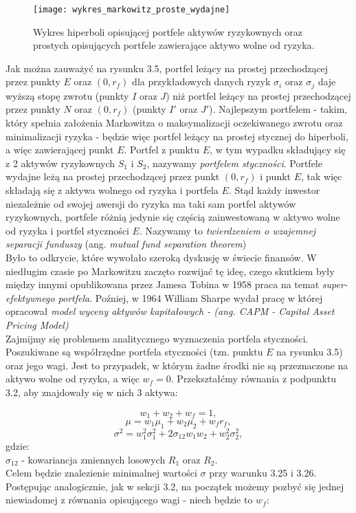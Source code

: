 \documentclass[magister]{dyplom}
\begin{document}
\begin{figure}[h]
	\centering
	\texttt{[image: wykres\_markowitz\_proste\_wydajne]}
	\caption{Wykres hiperboli opisującej portfele aktywów ryzykownych oraz prostych opisujących portfele zawierające aktywo wolne od ryzyka.}
\end{figure}

Jak można zauważyć na rysunku 3.5, portfel leżący na prostej przechodzącej przez punkty $E$ oraz $(0, r_f)$ dla przykładowych danych ryzyk $\sigma_i$ oraz $\sigma_j$ daje wyższą stopę zwrotu (punkty $I$ oraz $J$) niż portfel leżący na prostej przechodzącej przez punkty $N$ oraz $(0, r_f)$ (punkty $I'$ oraz $J'$). Najlepszym portfelem - takim, który spełnia założenia Markowitza o maksymalizacji oczekiwanego zwrotu oraz minimalizacji ryzyka - będzie więc portfel leżący na prostej stycznej do hiperboli, a więc zawierającej punkt $E$. Portfel z punktu $E$, w tym wypadku składujący się z 2 aktywów ryzykownych $S_1$ i $S_2$, nazywamy \textit{portfelem styczności}. Portfele wydajne leżą na prostej przechodzącej przez punkt $(0,r_f)$ i punkt $E$, tak więc składają się z aktywa wolnego od ryzyka i portfela $E$. Stąd każdy inwestor niezależnie od swojej awersji do ryzyka ma taki sam portfel aktywów ryzykownych, portfele różnią jedynie się częścią zainwestowaną w aktywo wolne od ryzyka i portfel styczności $E$. Nazywamy to \textit{twierdzeniem o wzajemnej separacji funduszy} (ang. \textit{mutual fund separation theorem})\\ 

Było to odkrycie, które wywołało szeroką dyskusję w świecie finansów. W niedługim czasie po Markowitzu zaczęto rozwijać tę ideę, czego skutkiem były między innymi opublikowana przez Jamesa Tobina w 1958 praca na temat \textit{super-efektywnego portfela}. Poźniej, w 1964 William Sharpe wydał pracę w której opracował \textit{model wyceny aktywów kapitałowych - (ang. CAPM - Capital Asset Pricing Model)}\cite{holton}\\

Zajmijmy się problemem analitycznego wyznaczenia portfela styczności. Poszukiwane są współrzędne portfela styczności (tzn. punktu $E$ na rysunku 3.5) oraz jego wagi. Jest to przypadek, w którym żadne środki nie są przeznaczone na aktywo wolne od ryzyka, a więc $w_f = 0$. Przekształćmy równania z podpunktu 3.2, aby znajdowały się w nich 3 aktywa: 

\begin{equation}
	w_1 + w_2 + w_f = 1,
\end{equation}
\begin{equation}
	\mu = w_1\mu_1 + w_2\mu_2 + w_fr_f,
\end{equation}
\begin{equation}
	\sigma^2 = w_1^2\sigma_1^2 + 2\sigma_{12}w_1w_2 + w_2^2\sigma_2^2,
\end{equation}
gdzie:\\
$\sigma_{12}$ - kowariancja zmiennych losowych $R_1$ oraz $R_2$.\\
Celem będzie znalezienie minimalnej wartości $\sigma$ przy warunku 3.25 i 3.26. Postępując analogicznie, jak w sekcji 3.2, na początek możemy pozbyć się jednej niewiadomej z równania opisującego wagi - niech będzie to $w_f$:
\end{document}
